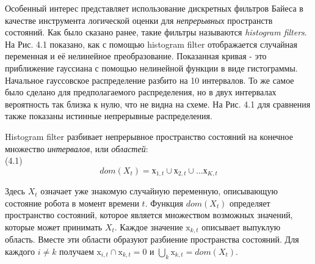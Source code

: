 \documentclass[10pt,a4paper]{article}
\begin{document}
Особенный интерес представляет использование дискретных фильтров Байеса в качестве инструмента логической оценки для \textit{непрерывных} пространств состояний. Как было сказано ранее, такие фильтры называются \textit{histogram filters}. На Рис. 4.1 показано, как с помощью histogram filter отображается случайная переменная и её нелинейное преобразование. Показанная кривая - это приближение гауссиана с помощью нелинейной функции в виде гистограммы. Начальное гауссовское распределение разбито на 10 интервалов. То же самое было сделано для предполагаемого распределения, но в двух интервалах вероятность так близка к нулю, что не видна на схеме. На Рис. 4.1 для сравнения также показаны истинные непрерывные распределения.

Histogram filter разбивает непрерывное пространство состояний на конечное множество \textit{интервалов}, или \textit{областей}:\\

(4.1)
$$dom(X_t)=\text{х}_{1,t}\cup \text{х}_{2,t}\cup...\text{х}_{K,t}$$

Здесь $X_t$ означает уже знакомую случайную переменную, описывающую состояние робота в момент времени $t$. Функция $dom(X_t)$ определяет пространство состояний, которое является множеством возможных значений, которые может принимать $X_t$. Каждое значение $\text{x}_{k,t}$ описывает выпуклую область.
Вместе эти области образуют разбиение пространства состояний. Для каждого $i\neq k$
получаем $\text{x}_{i,t}\cap \text{x}_{k,t} =0$ и $\bigcup_k\text{x}_{k,t} = dom(X_t)$.
\end{document}

